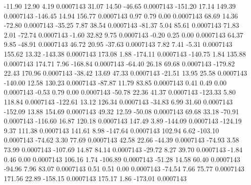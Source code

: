       -11.90       12.90        4.19     0.0007143
       31.07       14.50      -46.65     0.0007143
     -151.20       17.14      149.39     0.0007143
     -146.45       14.94      156.77     0.0007143
        0.97        0.79        0.00     0.0007143
       68.69       14.36      -72.80     0.0007143
      -35.25        7.87       38.54     0.0007143
      -81.37        5.04       85.61     0.0007143
       71.83        2.01      -72.74     0.0007143
       -1.60       32.82        9.75     0.0007143
       -0.20        0.25        0.00     0.0007143
       64.37        9.85      -48.91     0.0007143
       46.72       20.95      -37.63     0.0007143
        7.82        7.41       -5.31     0.0007143
      155.62       13.32     -143.38     0.0007143
      173.08        1.88     -174.11     0.0007143
     -140.75        1.84      135.88     0.0007143
      174.71        7.96     -168.84     0.0007143
      -64.40       26.18       69.68     0.0007143
     -179.82       22.43      170.96     0.0007143
      -38.42       13.69       47.33     0.0007143
      -21.51       13.95       25.58     0.0007143
     -140.00       12.58      130.23     0.0007143
      -87.87       11.79       83.85     0.0007143
        0.41        0.49        0.00     0.0007143
       -0.53        0.79        0.00     0.0007143
      -50.78       22.36       41.37     0.0007143
     -123.33        5.80      118.84     0.0007143
     -122.61       13.12      126.34     0.0007143
      -34.83        6.99       31.60     0.0007143
     -152.09       13.88      154.69     0.0007143
       49.32       12.59      -50.08     0.0007143
       69.68       33.18      -70.91     0.0007143
     -116.60       16.87      120.18     0.0007143
      147.49        3.89     -144.09     0.0007143
     -124.19        9.37      111.38     0.0007143
      141.61        8.98     -147.64     0.0007143
      102.94        6.62     -103.10     0.0007143
      -74.62        3.30       77.69     0.0007143
       42.58       22.66      -44.39     0.0007143
      -74.93        3.58       73.99     0.0007143
     -107.69       14.87       84.14     0.0007143
      -29.72        8.27       39.70     0.0007143
       -1.84        0.46        0.00     0.0007143
      106.16        1.74     -106.89     0.0007143
      -51.28       14.58       60.40     0.0007143
      -94.96        7.96       83.07     0.0007143
        0.51        0.51        0.00     0.0007143
      -74.54        7.66       75.77     0.0007143
      171.56       22.89     -158.15     0.0007143
      175.17        1.86     -173.01     0.0007143
